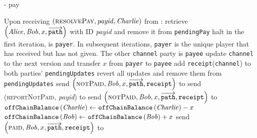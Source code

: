 \begin{systembox}{\fpaynet - pay}
\begin{algorithmic}[1]
    \State Upon receiving $\left(\textsc{resolvePay}, \mathit{payid},
    \mathit{Charlie}\right)$ from \simulator:
    \Indent
      \State retrieve $\left(\mathit{Alice}, \mathit{Bob}, x,
      \overrightarrow{\mathtt{path}}\right)$ with ID \textit{payid} and remove
      it from \texttt{pendingPay}
        \State halt
      \EndIf
        \State in the first iteration, \charlie{} is \texttt{payer}. In
        subsequent iterations, \texttt{payer} is the unique player that has
        received but has not given. The other \texttt{channel} party is
        \texttt{payee}
          \State update \texttt{channel} to the next version and transfer $x$
          from \texttt{payer} to \texttt{payee}
          \State add \texttt{receipt}(\texttt{channel}) to both parties'
          \texttt{pendingUpdates}
        \Else
          \State revert all updates and remove them from
          \texttt{pendingUpdates}
          \State {}
            \State send $\left(\textsc{notPaid}, \mathit{Bob}, x,
            \overrightarrow{\mathtt{path}}, \mathtt{receipt}\right)$ to \alice
          \Else
            \State send (\textsc{reportNotPaid}, \textit{payid}) to
            \simulator {}
              \State send $\left(\textsc{notPaid}, \mathit{Bob}, x,
              \overrightarrow{\mathtt{path}}, \mathtt{receipt}\right)$ to
              \alice
            \EndIf
          \EndIf
          \State {}
        \EndIf
      \EndFor
      \State $\mathtt{offChainBalance}\left(\mathit{Charlie}\right) \gets
      \mathtt{offChainBalance}\left(\mathit{Charlie}\right) - x$
      \State $\mathtt{offChainBalance}\left(\mathit{Bob}\right) \gets
      \mathtt{offChainBalance}\left(\mathit{Bob}\right) + x$
      \If{\charlie{} = \alice}
        \State send $\left(\textsc{paid}, \mathit{Bob}, x,
        \overrightarrow{\mathtt{path}}, \mathtt{receipt}\right)$ to \alice
      \EndIf
    \EndIndent
  \end{algorithmic}
\end{systembox}

